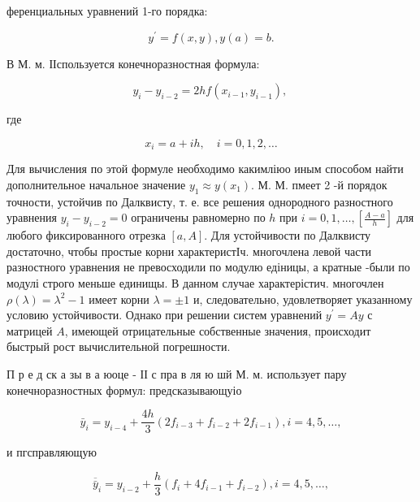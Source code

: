 \documentclass[10pt]{article}
\begin{document}
ференциальных уравнений 1-го порядка:



\[

y^{\prime}=f(x, y), y(a)=b .

\]



В М. м. ІІспользуется конечноразностная формула:



\[

y_{i}-y_{i-2}=2 h f\left(x_{i-1}, y_{i-1}\right) \text {, }

\]



где



\[

x_{i}=a+i h, \quad i=0,1,2, \ldots

\]



Для вычисления по этой формуле необходимо какимліюо иным способом найти дополнительное начальное значение $y_{1} \approx y\left(x_{1}\right)$. М. М. пмеет 2 -й порядок точности, устойчив по Далквисту, т. е. все решения однородного разностного уравнения $y_{i}-y_{i-2}=0$ ограничены равномерно по $h$ при $i=0,1, \ldots,\left[\frac{A-a}{h}\right]$ для любого фиксированного отрезка $[a, A]$. Для устойчивости по Далквисту достаточно, чтобы простые корни характеристІч. многочлена левой части разностного уравнения не превосходили по модулю едіницы, а кратные -были по модулі строго меньше единищы. В данном случае характерістич. многочлен $\rho(\lambda)=\lambda^{2}-1$ имеет корни $\lambda= \pm 1$ и, следовательно, удовлетворяет указанному условию устойчивости. Однако при решении систем уравнений $y^{\prime}=A y$ с матрицей $A$, имеющей отрицательные собственные значения, происходит быстрый рост вычислительной погрешности.



П р е д ск а зы в а юоце - ІІ с пра в ля ю шй М. м. использует пару конечноразностных формул: предсказывающуіо



\[

\bar{y}_{i}=y_{i-4}+\frac{4 h}{3}\left(2 f_{i-3}+f_{i-2}+2 f_{i-1}\right), i=4,5, \ldots,

\]



и пгсправляющую



\[

\overline{\bar{y}}_{i}=y_{i-2}+\frac{h}{3}\left(f_{i}+4 f_{i-1}+f_{i-2}\right), i=4,5, \ldots,

\]
\end{document}
